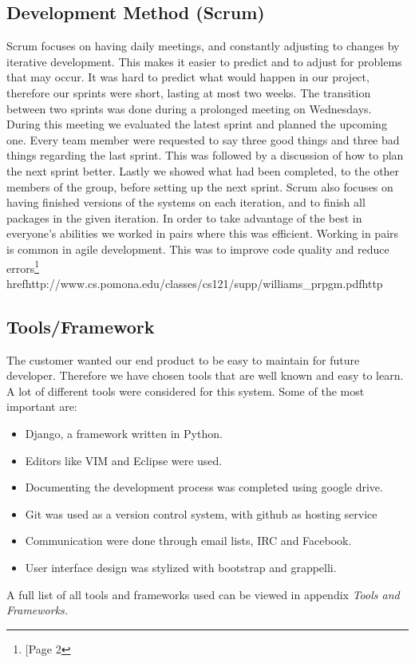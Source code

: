 \subsection{Development Method (Scrum)}
Scrum focuses on having daily meetings, and constantly adjusting to
changes by iterative development. This makes it easier to predict and
to adjust for problems that may occur. It was hard to predict what
would happen in our project, therefore our sprints were short, lasting
at most two weeks. The transition between two sprints was done during a
prolonged meeting on Wednesdays. During this meeting we evaluated the
latest sprint and planned the upcoming one. Every team member were
requested to say three good things and three bad things regarding the
last sprint. This was followed by a discussion of how to plan the next
sprint better. Lastly we showed what had been completed, to the other
members of the group, before setting up the next sprint. Scrum also
focuses on having finished versions of the systems on each iteration,
and to finish all packages in the given iteration.
In order to take advantage of the best in everyone's
abilities we worked in pairs where this was efficient. Working in pairs
is common in agile development. This was to improve code quality and
reduce errors\footnote{[Page 2}
href{http://www.cs.pomona.edu/classes/cs121/supp/williams_prpgm.pdf}{http}

\subsection{Tools/Framework}
The customer wanted our end product to be easy to maintain for future
developer. Therefore we have chosen tools that are well known and easy
to learn. A lot of different tools were considered for this system. Some of the
most important are:

\begin{itemize}
    \item Django, a framework written in Python.
    \item Editors like VIM and Eclipse were used. 
    \item Documenting the development process was completed using google drive.
    \item Git was used as a version control system, with github as hosting
        service
    \item Communication were done through email lists, IRC and Facebook. 
    \item User interface design was stylized with bootstrap and grappelli. 
\end{itemize}
A full list of all tools and frameworks used can be viewed in appendix
\textit{Tools and Frameworks.}

